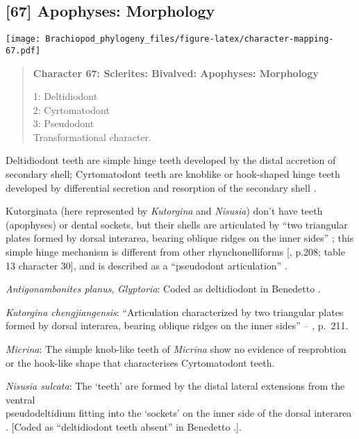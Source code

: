 \documentclass[openany]{book}
\theoremstyle{definition}
\theoremstyle{definition}
\theoremstyle{definition}
\theoremstyle{remark}
\begin{document}
\subsection*{{[}67{]} Apophyses: Morphology}\label{apophyses-morphology}

\texttt{[image: Brachiopod\_phylogeny\_files/figure-latex/character-mapping-67.pdf]}

\begin{quote}
\textbf{Character 67: Sclerites: Bivalved: Apophyses: Morphology}

1: Deltidiodont\\
2: Cyrtomatodont\\
3: Pseudodont\\
Transformational character.
\end{quote}

Deltidiodont teeth are simple hinge teeth developed by the distal
accretion of secondary shell; Cyrtomatodont teeth are knoblike or
hook-shaped hinge teeth developed by differential secretion and
resorption of the secondary shell \citep[fig. 322
in][]{Williams1997Introduction}.

Kutorginata (here represented by \emph{Kutorgina} and \emph{Nisusia})
don't have teeth (apophyses) or dental sockets, but their shells are
articulated by ``two triangular plates formed by dorsal interarea,
bearing oblique ridges on the inner sides''
\citep[p.~211]{Williams2000LinguliformeaCraniiformea}; this simple hinge
mechanism is different from other rhynchonelliforms
{[}\citet{Williams2000LinguliformeaCraniiformea}, p.208; table 13
character 30{]}, and is described as a ``pseudodont articulation''
\citep{Holmer2018Evolutionarysignificance}.

\hypertarget{Antigonambonites_planus-coding-67}{}
\emph{Antigonambonites planus}, \emph{Glyptoria}: Coded as deltidiodont
in Benedetto \citeyearpar{Benedetto2009iChaniella}.

\hypertarget{Kutorgina_chengjiangensis-coding-67}{}
\emph{Kutorgina chengjiangensis}: ``Articulation characterized by two
triangular plates formed by dorsal interarea, bearing oblique ridges on
the inner sides'' -- \citet{Williams2000LinguliformeaCraniiformea},
p.~211.

\hypertarget{Micrina-coding-67}{}
\emph{Micrina}: The simple knob-like teeth of \emph{Micrina} show no
evidence of resprobtion or the hook-like shape that characterises
Cyrtomatodont teeth.

\hypertarget{Nisusia_sulcata-coding-67}{}
\emph{Nisusia sulcata}: The `teeth' are formed by the distal lateral
extensions from the ventral\\
pseudodeltidium fitting into the `sockets' on the inner side of the
dorsal interarea \citep{Holmer2018Evolutionarysignificance}. {[}Coded as
``deltidiodont teeth absent'' in Benedetto
\citeyearpar{Benedetto2009iChaniella}.{]}.
\end{document}
